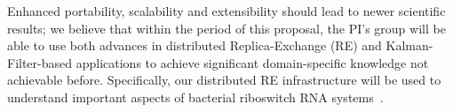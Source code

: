 \documentclass[10pt,letterpaper]{article}
\begin{document}
Enhanced portability, scalability and extensibility should lead to
newer scientific results; we believe that within the period of this
proposal, the PI's group will be able to use both advances in
distributed Replica-Exchange (RE) and Kalman-Filter-based applications
to achieve significant domain-specific knowledge not achievable before.
Specifically, our distributed RE infrastructure will be used to
understand important aspects of bacterial riboswitch RNA
systems~\cite{jha_frg_url}.

\end{document}
